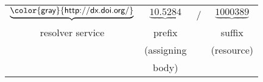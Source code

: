\centering
\begin{tabular}{c@{\,}c@{\,}c@{\,}c}
\Large$\underbrace{\textsf{\color{gray}{http://dx.doi.org/}}}$
& \Large$\underbrace{10\textsf{.}5284}$ 
& \Large / 
& \Large$\underbrace{1000389}$ \\
resolver service& prefix & & suffix \\
& (assigning & & (resource)\\
& body) & & \\
\end{tabular} 
